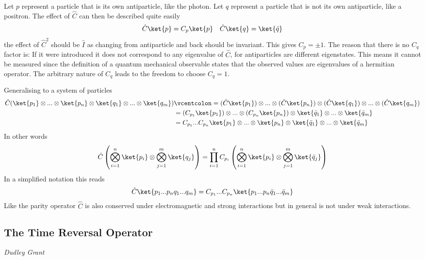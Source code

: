 Let $p$ represent a particle that is its own antiparticle, like the photon. Let $q$ represent a particle that is not its own antiparticle, like a positron. The effect of $\hat{C}$ can then be described quite easily
\begin{align*}
&\hat{C}\ket{p} = C_p \ket{p}   &\hat{C}\ket{q} = \ket{\bar{q}}
\end{align*}
the effect of $\hat{C}^2$ should be $\hat{I}$ as changing from antiparticle and back should be invariant. This gives $C_p= \pm 1$. The reason that there is no $C_q$ factor is: If it were introduced it does not correspond to any eigenvalue of $\hat{C}$, for antiparticles are different eigenstates. This means it cannot be measured since the definition of a quantum mechanical observable states that the observed values are eigenvalues of a hermitian operator. The arbitrary nature of $C_q$ leads to the freedom to choose $C_q=1$.

Generalising to a system of particles
\begin{align*}
\hat{C}(\ket{p_1}\otimes...\otimes\ket{p_n}\otimes\ket{q_1}\otimes...\otimes\ket{q_m}) &\vcentcolon= (\hat{C}\ket{p_1})\otimes...\otimes(\hat{C}\ket{p_n})\otimes(\hat{C}\ket{q_1})\otimes...\otimes(\hat{C}\ket{q_m}) \\
&= (C_{p_1}\ket{p_1})\otimes...\otimes(C_{p_n}\ket{p_n})\otimes\ket{\bar{q}_1}\otimes...\otimes\ket{\bar{q}_m}  \\
&= C_{p_1}...C_{p_n}\ket{p_1}\otimes...\otimes\ket{p_n}\otimes\ket{\bar{q}_1}\otimes...\otimes\ket{\bar{q}_m}  
\end{align*}
In other words
\begin{align*}
\hat{C}\left(\bigotimes_{i=1}^n\ket{p_i} \otimes \bigotimes_{j=1}^m \ket{q_j} \right) = \prod_{i=1}^n C_{p_i} \left(\bigotimes_{i=1}^n\ket{p_i} \otimes \bigotimes_{j=1}^m \ket{\bar{q}_j} \right)
\end{align*}
In a simplified notation this reads
\begin{align*}
\hat{C}\ket{p_1...p_nq_1...q_m}=C_{p_1}...C_{p_n}\ket{p_1...p_n\bar{q}_1...\bar{q}_m}
\end{align*}
Like the parity operator $\hat{C}$ is also conserved under electromagnetic and strong interactions but in general is not under weak interactions.

\subsection{The Time Reversal Operator}
\vspace{-1.0em}
\begin{center}
\tiny{\textit{Dudley Grant}}
\end{center}

